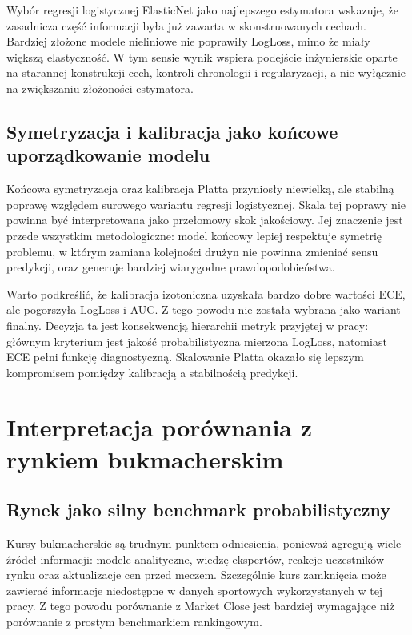 Wybór regresji logistycznej ElasticNet jako najlepszego estymatora wskazuje, że zasadnicza część informacji była już zawarta w skonstruowanych cechach. Bardziej złożone modele nieliniowe nie poprawiły LogLoss, mimo że miały większą elastyczność. W tym sensie wynik wspiera podejście inżynierskie oparte na starannej konstrukcji cech, kontroli chronologii i regularyzacji, a nie wyłącznie na zwiększaniu złożoności estymatora.

\subsection{Symetryzacja i kalibracja jako końcowe uporządkowanie modelu}

Końcowa symetryzacja oraz kalibracja Platta przyniosły niewielką, ale stabilną poprawę względem surowego wariantu regresji logistycznej. Skala tej poprawy nie powinna być interpretowana jako przełomowy skok jakościowy. Jej znaczenie jest przede wszystkim metodologiczne: model końcowy lepiej respektuje symetrię problemu, w którym zamiana kolejności drużyn nie powinna zmieniać sensu predykcji, oraz generuje bardziej wiarygodne prawdopodobieństwa.

Warto podkreślić, że kalibracja izotoniczna uzyskała bardzo dobre wartości ECE, ale pogorszyła LogLoss i AUC. Z tego powodu nie została wybrana jako wariant finalny. Decyzja ta jest konsekwencją hierarchii metryk przyjętej w pracy: głównym kryterium jest jakość probabilistyczna mierzona LogLoss, natomiast ECE pełni funkcję diagnostyczną. Skalowanie Platta okazało się lepszym kompromisem pomiędzy kalibracją a stabilnością predykcji.

\section{Interpretacja porównania z rynkiem bukmacherskim}

\subsection{Rynek jako silny benchmark probabilistyczny}

Kursy bukmacherskie są trudnym punktem odniesienia, ponieważ agregują wiele źródeł informacji: modele analityczne, wiedzę ekspertów, reakcje uczestników rynku oraz aktualizacje cen przed meczem. Szczególnie kurs zamknięcia może zawierać informacje niedostępne w danych sportowych wykorzystanych w tej pracy. Z tego powodu porównanie z Market Close jest bardziej wymagające niż porównanie z prostym benchmarkiem rankingowym.

